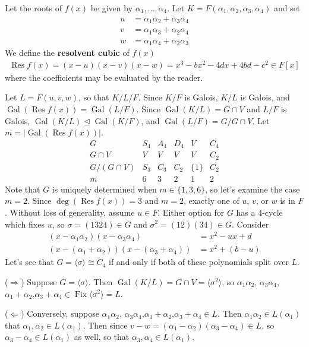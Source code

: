 \documentclass[11pt, a4paper]{memoir}
\newcommand{\mbf}[1]{{\boldmath\bfseries #1}}
\newcommand{\impr}{{($\Rightarrow$)\hspace{0.2cm}}}
\newcommand{\impl}{{($\Leftarrow$)\hspace{0.2cm}}}
\theoremstyle{change}
\theoremstyle{plain}
\theoremstyle{nonumberplain}
\DeclareMathOperator{\Fix}{Fix}
\DeclareMathOperator{\Gal}{Gal}
\DeclareMathOperator{\Res}{Res}
\numberwithin{equation}{section}
\begin{document}
Let the roots of $f(x)$ be given by $\alpha_1,\ldots,\alpha_4$.
Let $K=F(\alpha_1,\alpha_2,\alpha_3,\alpha_4)$ and set
\begin{align*}
    u&=\alpha_1\alpha_2+\alpha_3\alpha_4\\
    v&=\alpha_1\alpha_3+\alpha_2\alpha_4\\
    w&=\alpha_1\alpha_4+\alpha_2\alpha_3
\end{align*}
We define the \mbf{resolvent cubic} of $f(x)$
\begin{align*}
    \Res f(x) = (x-u)(x-v)(x-w)=x^3-bx^2-4dx+4bd-c^2\in F[x]
\end{align*}
where the coefficients may be evaluated by the reader.

Let $L=F(u,v,w)$, so that $K/L/F$.
Since $K/F$ is Galois, $K/L$ is Galois, and $\Gal(\Res f(x))=\Gal(L/F)$.
Since $\Gal(K/L)=G\cap V$ and $L/F$ is Galois, $\Gal(K/L)\trianglelefteq\Gal(K/F)$, and $\Gal(L/F)=G/G\cap V$.
Let $m=|\Gal(\Res f(x))|$.
\begin{equation*}
    \begin{array}{c|ccccc}
        G & S_4 & A_4 & D_4 & V & C_4\\
        \hline
        G\cap V &V&V&V&V&C_2\\
        G/(G\cap V) & S_3 & C_3 & C_2 & \{1\} & C_2\\
        m & 6 & 3 & 2 & 1 & 2
    \end{array}
\end{equation*}
Note that $G$ is uniquely determined when $m\in\{1,3,6\}$, so let's examine the case $m=2$.
Since $\deg(\Res f(x))=3$ and $m=2$, exactly one of $u$, $v$, or $w$ is in $F$.
Without loss of generality, assume $u\in F$.
Either option for $G$ has a 4-cycle which fixes $u$, so $\sigma=(1324)\in G$ and $\sigma^2=(12)(34)\in G$.
Consider
\begin{align*}
    (x-\alpha_1\alpha_2)(x-\alpha_3\alpha_4) &=x^2-ux+d\\
    (x-(\alpha_1+\alpha_2))(x-(\alpha_3+\alpha_4)) &=x^2+(b-u)
\end{align*}
Let's see that $G=\langle\sigma\rangle\cong C_4$ if and only if both of these polynomials split over $L$.

\impr
Suppose $G=\langle\sigma\rangle$.
Then $\Gal(K/L)=G\cap V=\langle\sigma^2\rangle$, so $\alpha_1\alpha_2$, $\alpha_3\alpha_4$,$\alpha_1+\alpha_2$,$\alpha_3+\alpha_4\in\Fix\langle\sigma^2\rangle=L$.

\impl
Conversely, suppose $\alpha_1\alpha_2$, $\alpha_3\alpha_4$,$\alpha_1+\alpha_2$,$\alpha_3+\alpha_4\in L$.
Then $\alpha_1\alpha_2\in L(\alpha_1)$ that $\alpha_1,\alpha_2\in L(\alpha_1)$.
Then since $v-w=(\alpha_1-\alpha_2)(\alpha_3-\alpha_4)\in L$, so $\alpha_3-\alpha_4\in L(\alpha_1)$ as well, so that $\alpha_3,\alpha_4\in L(\alpha_1)$.
\end{document}
